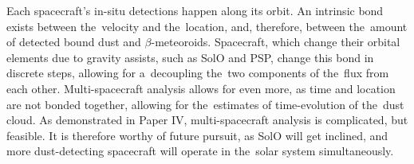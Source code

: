 Each spacecraft's in-situ detections happen along its orbit. An intrinsic bond exists between the~velocity and the~location, and, therefore, between the~amount of detected bound dust and $\beta$-meteoroids. Spacecraft, which change their orbital elements due to gravity assists, such as SolO and PSP, change this bond in discrete steps, allowing for a~decoupling the~two components of the~flux from each other. Multi-spacecraft analysis allows for even more, as time and location are not bonded together, allowing for the~estimates of time-evolution of the~dust cloud. As demonstrated in Paper IV, multi-spacecraft analysis is complicated, but feasible. It is therefore worthy of future pursuit, as SolO will get inclined, and more dust-detecting spacecraft will operate in the~solar system simultaneously. 